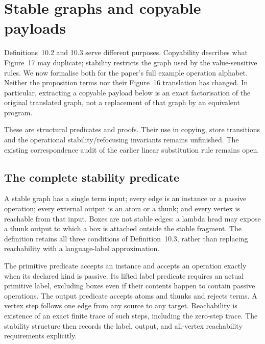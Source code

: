\clearpage
\section{Stable graphs and copyable payloads}
\label{sec:copying-values}
Definitions~10.2 and 10.3 serve different purposes. Copyability describes
what Figure~17 may duplicate; stability restricts the graph used by the
value-sensitive rules. We now formalise both for the paper's full example
operation alphabet. Neither the proposition terms nor their Figure~16
translation has changed. In particular, extracting a copyable payload below
is an exact factorisation of the original translated graph, not a replacement
of that graph by an equivalent program.

These are structural predicates and proofs. Their use in copying, store
transitions and the operational stability/refocusing invariants remains
unfinished. The existing correspondence audit of the earlier linear
substitution rule remains open.

\subsection{The complete stability predicate}
A stable graph has a single term input; every edge is an instance or a
passive operation; every external output is an atom or a thunk; and every
vertex is reachable from that input. Boxes are not stable edges: a lambda
head may expose a thunk output to which a box is attached outside the stable
fragment. The definition retains all three conditions of Definition~10.3,
rather than replacing reachability with a language-label approximation.

The primitive predicate accepts an instance and accepts an operation exactly
when its declared kind is passive. Its lifted label predicate requires an
actual primitive label, excluding boxes even if their contents happen to
contain passive operations. The output predicate accepts atoms and thunks
and rejects terms. A vertex step follows one edge from any source to any
target. Reachability is existence of an exact finite trace of such steps,
including the zero-step trace. The stability structure then records the
label, output, and all-vertex reachability requirements explicitly.




